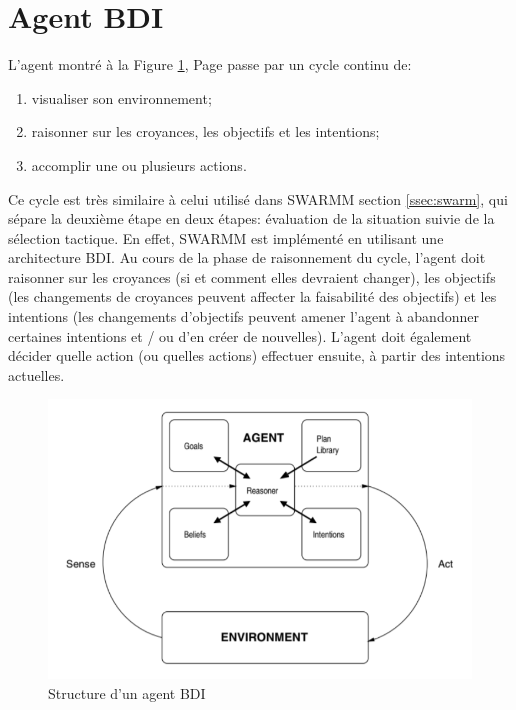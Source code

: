 \section{Agent BDI}

L'agent montré à la Figure \ref{fig:bdi}, Page \pageref{fig:bdi} passe par un cycle continu de:

\begin{enumerate}
\item visualiser son environnement;
\item raisonner sur les croyances, les objectifs et les intentions;
\item accomplir une ou plusieurs actions.
\end{enumerate}

Ce cycle est très similaire à celui utilisé dans SWARMM section \ref{ssec:swarm}, qui sépare la deuxième étape en deux étapes: évaluation de la situation suivie de la sélection tactique. En effet, SWARMM est implémenté en utilisant une architecture BDI. Au cours de la phase de raisonnement du cycle, l'agent doit raisonner sur les croyances (si et comment elles devraient changer), les objectifs (les changements de croyances peuvent affecter la faisabilité des objectifs) et les intentions (les changements d'objectifs peuvent amener l'agent à abandonner certaines intentions et / ou d’en créer de nouvelles). L'agent doit également décider quelle action (ou quelles actions) effectuer ensuite, à partir des intentions actuelles.


\begin{figure}[th]
\centering
\includegraphics{Figures/bdi.PNG}
\decoRule
\caption[ Structure d’un agent BDI ] { Structure d’un agent BDI }
\label{fig:bdi}
\end{figure}


